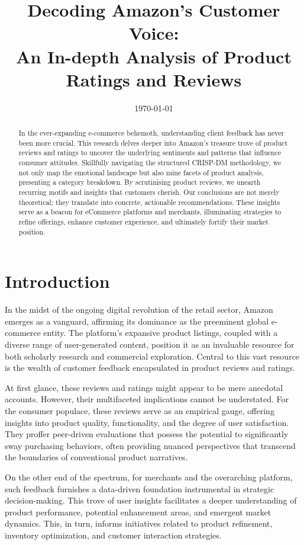 \documentclass[12pt]{article}
\title{Decoding Amazon's Customer Voice: \\ An In-depth Analysis of Product Ratings and Reviews}
\date{\today}
\begin{document}
\maketitle

\begin{abstract}
    In the ever-expanding e-commerce behemoth, understanding client feedback has never been more crucial. This research delves deeper into Amazon's treasure trove of product reviews and ratings to uncover the underlying sentiments and patterns that influence consumer attitudes. Skillfully navigating the structured CRISP-DM methodology, we not only map the emotional landscape but also mine facets of product analysis, presenting a category breakdown. By scrutinising product reviews, we unearth recurring motifs and insights that customers cherish. Our conclusions are not merely theoretical; they translate into concrete, actionable recommendations. These insights serve as a beacon for eCommerce platforms and merchants, illuminating strategies to refine offerings, enhance customer experience, and ultimately fortify their market position.
\end{abstract}


\section{Introduction}

In the midst of the ongoing digital revolution of the retail sector, Amazon emerges as a vanguard, affirming its dominance as the preeminent global e-commerce entity. The platform's expansive product listings, coupled with a diverse range of user-generated content, position it as an invaluable resource for both scholarly research and commercial exploration. Central to this vast resource is the wealth of customer feedback encapsulated in product reviews and ratings.

At first glance, these reviews and ratings might appear to be mere anecdotal accounts. However, their multifaceted implications cannot be understated. For the consumer populace, these reviews serve as an empirical gauge, offering insights into product quality, functionality, and the degree of user satisfaction. They proffer peer-driven evaluations that possess the potential to significantly sway purchasing behaviors, often providing nuanced perspectives that transcend the boundaries of conventional product narratives.

On the other end of the spectrum, for merchants and the overarching platform, such feedback furnishes a data-driven foundation instrumental in strategic decision-making. This trove of user insights facilitates a deeper understanding of product performance, potential enhancement areas, and emergent market dynamics. This, in turn, informs initiatives related to product refinement, inventory optimization, and customer interaction strategies.
\end{document}

